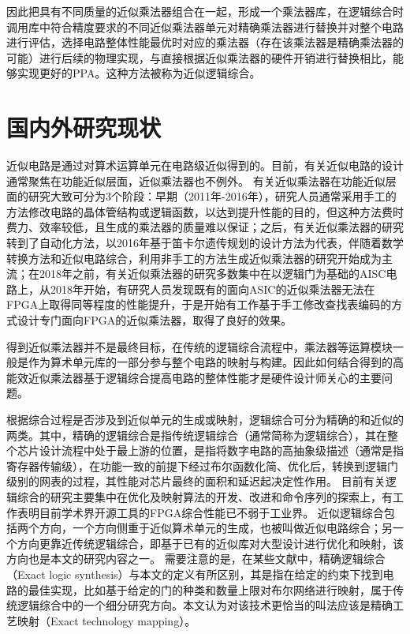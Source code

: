因此把具有不同质量的近似乘法器组合在一起，形成一个乘法器库，在逻辑综合时调用库中符合精度要求的不同近似乘法器单元对精确乘法器进行替换并对整个电路进行评估，选择电路整体性能最优时对应的乘法器（存在该乘法器是精确乘法器的可能）进行后续的物理实现，与直接根据近似乘法器的硬件开销进行替换相比，能够实现更好的PPA。这种方法被称为近似逻辑综合。


\section{国内外研究现状}


近似电路是通过对算术运算单元在电路级近似得到的。目前，有关近似电路的设计通常聚焦在功能近似层面\cite{AC:ALS:survey}，近似乘法器也不例外。
有关近似乘法器在功能近似层面的研究大致可分为3个阶段：早期（2011年-2016年），研究人员通常采用手工的方法修改电路的晶体管结构\cite{AC:AM:IMPACT}或逻辑函数\cite{AC:AM:KMap}，以达到提升性能的目的，但这种方法费时费力、效率较低，且生成的乘法器的质量难以保证；之后，有关近似乘法器的研究转到了自动化方法，以2016年基于笛卡尔遗传规划的设计方法为代表\cite{AC:AM:CGP_2016}，伴随着数学转换方法\cite{AC:AM:OU}和近似电路综合\cite{AC:ALS:ALSRAC}，利用非手工的方法生成近似乘法器的研究开始成为主流；在2018年之前，有关近似乘法器的研究多数集中在以逻辑门为基础的AISC电路上，从2018年开始，有研究人员发现既有的面向ASIC的近似乘法器无法在FPGA上取得同等程度的性能提升，于是开始有工作基于手工修改查找表编码的方式设计专门面向FPGA的近似乘法器，取得了良好的效果\cite{AC:AM:FPGA:SMApproxLib}。


得到近似乘法器并不是最终目标，在传统的逻辑综合流程中，乘法器等运算模块一般是作为算术单元库的一部分参与整个电路的映射与构建。因此如何结合得到的高能效近似乘法器基于逻辑综合提高电路的整体性能才是硬件设计师关心的主要问题。

根据综合过程是否涉及到近似单元的生成或映射，逻辑综合可分为精确的和近似的两类。其中，精确的逻辑综合是指传统逻辑综合（通常简称为逻辑综合），其在整个芯片设计流程中处于最上游的位置，是指将数字电路的高抽象级描述（通常是指寄存器传输级），在功能一致的前提下经过布尔函数化简、优化后，转换到逻辑门级别的网表的过程，其性能对芯片最终的面积和延迟起决定性作用。
目前有关逻辑综合的研究主要集中在优化及映射算法的开发、改进\cite{LS:Narrowing}和命令序列的探索上\cite{LS:Bulls-Eye}，有工作表明目前学术界开源工具的FPGA综合性能已不弱于工业界\cite{LS:Narrowing}。
近似逻辑综合包括两个方向，一个方向侧重于近似算术单元的生成，也被叫做近似电路综合；另一个方向更靠近传统逻辑综合，即基于已有的近似库对大型设计进行优化和映射，该方向也是本文的研究内容之一。
需要注意的是，在某些文献中，精确逻辑综合（Exact logic synthesis）与本文的定义有所区别，其是指在给定的约束下找到电路的最佳实现，比如基于给定的门的种类和数量上限对布尔网络进行映射\cite{LS:exact_syn}，属于传统逻辑综合中的一个细分研究方向。本文认为对该技术更恰当的叫法应该是精确工艺映射（Exact technology mapping）。

